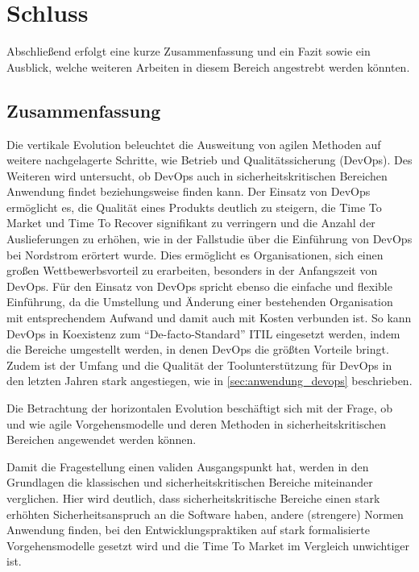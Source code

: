 \chapter{Schluss} %

Abschließend erfolgt eine kurze Zusammenfassung und ein Fazit sowie ein Ausblick, welche weiteren Arbeiten in diesem Bereich angestrebt werden könnten.

\section{Zusammenfassung}

Die vertikale Evolution beleuchtet die Ausweitung von agilen Methoden auf weitere nachgelagerte Schritte, wie Betrieb und Qualitätssicherung (DevOps).
Des Weiteren wird untersucht, ob DevOps auch in sicherheitskritischen Bereichen Anwendung findet beziehungsweise finden kann.
Der Einsatz von DevOps ermöglicht es, die Qualität eines Produkts deutlich zu steigern, die Time To Market und Time To Recover signifikant zu verringern und die Anzahl der Auslieferungen zu erhöhen, wie in der Fallstudie über die Einführung von DevOps bei Nordstrom erörtert wurde. 
Dies ermöglicht es Organisationen, sich einen großen Wettbewerbsvorteil zu erarbeiten, besonders in der Anfangszeit von DevOps. 
Für den Einsatz von DevOps spricht ebenso die einfache und flexible Einführung, da die Umstellung und Änderung einer bestehenden Organisation mit entsprechendem Aufwand und damit auch mit Kosten verbunden ist. 
So kann DevOps in Koexistenz zum \enquote{De-facto-Standard} ITIL eingesetzt werden, indem die Bereiche umgestellt werden, in denen DevOps die größten Vorteile bringt. 
Zudem ist der Umfang und die Qualität der Toolunterstützung für DevOps in den letzten Jahren stark angestiegen, wie in \autoref{sec:anwendung_devops} beschrieben.

Die Betrachtung der horizontalen Evolution beschäftigt sich mit der Frage, ob und wie agile Vorgehensmodelle und deren Methoden in sicherheitskritischen Bereichen angewendet werden können.

Damit die Fragestellung einen validen Ausgangspunkt hat, werden in den Grundlagen die klassischen und sicherheitskritischen Bereiche miteinander verglichen.
Hier wird deutlich, dass sicherheitskritische Bereiche einen stark erhöhten Sicherheitsanspruch an die Software haben, andere (strengere) Normen Anwendung finden, bei den Entwicklungspraktiken auf stark formalisierte Vorgehensmodelle gesetzt wird und die Time To Market im Vergleich unwichtiger ist.

